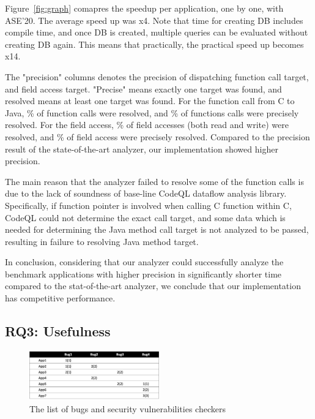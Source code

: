 Figure~\ref{fig:graph} comapres the speedup per application, one by one, with ASE'20.
The average speed up was x4. Note that time for creating DB includes compile
time, and once DB is created, multiple queries can be evaluated without
creating DB again. This means that practically, the practical speed up becomes
x14.

The "precision" columns denotes the precision of dispatching function call
target, and field access target.  "Precise" means exactly one target was found,
and resolved means at least one target was found. For the function call from C to Java,
\% of function calls were resolved, and \% of functions calls
were precisely resolved. For the field access, \% of field accesses (both
read and write) were resolved, and \% of field access were precisely resolved.
Compared to the precision result of the state-of-the-art analyzer, our implementation
showed higher precision.

The main reason that the analyzer failed to resolve some of the function calls
is due to the lack of soundness of base-line CodeQL dataflow analysis library.
Specifically, if function pointer is involved when calling C function within C,
CodeQL could not determine the exact call target, and some data which is needed
for determining the Java method call target is not analyzed to be passed, resulting
in failure to resolving Java method target.

In conclusion, considering that our analyzer could successfully analyze the
benchmark applications with higher precision in significantly shorter time
compared to the stat-of-the-art analyzer, we conclude that our implementation
has competitive performance.

\subsection{RQ3: Usefulness}
\begin{figure}[t]
  \centering
  \vspace{2mm}
  \includegraphics[width=0.5\textwidth]{img/table3}
  \vspace*{-1.5em}
  \caption{The list of bugs and security vulnerabilities checkers}
  \label{fig:table3}
\vspace*{-.5em}
\end{figure}

